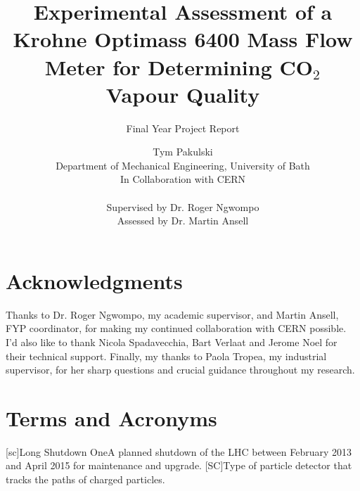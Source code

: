 \documentclass{report}
\author{Tym Pakulski\\Department of Mechanical Engineering, University of Bath\\In Collaboration with CERN \\\\ Supervised by Dr. Roger Ngwompo\\Assessed by Dr. Martin Ansell}
\title{Experimental Assessment of a Krohne Optimass 6400 Mass Flow Meter for Determining CO$_2$ Vapour Quality}
\subtitle{Final Year Project Report}
\begin{document}
\graphicspath{{figures/}}
%
\maketitle
\begin{abstract}
\end{abstract}
\section*{Acknowledgments}
Thanks to Dr. Roger Ngwompo, my academic supervisor, and Martin Ansell, FYP coordinator, for making my continued collaboration with CERN possible. I'd also like to thank Nicola Spadavecchia, Bart Verlaat and Jerome Noel for their technical support. Finally, my thanks to Paola Tropea, my industrial supervisor, for her sharp questions and crucial guidance throughout my research. 
\newpage
\section*{Terms and Acronyms}
\begin{acronym}
[sc]{Long Shutdown One}{A planned shutdown of the LHC between February 2013 and April 2015 for maintenance and upgrade.}
[SC]{Type of particle detector that tracks the paths of charged particles.} 
\end{acronym}
\end{document}
